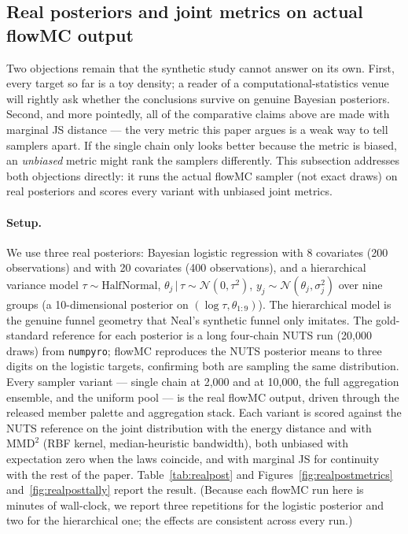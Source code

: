 \documentclass[11pt]{article}
\begin{document}
\subsection{Real posteriors and joint metrics on actual flowMC output}
\label{sec:realpost}
Two objections remain that the synthetic study cannot answer on its own. First,
every target so far is a toy density; a reader of a computational-statistics
venue will rightly ask whether the conclusions survive on genuine Bayesian
posteriors. Second, and more pointedly, all of the comparative claims above are
made with marginal JS distance --- the very metric this paper argues is a weak
way to tell samplers apart. If the single chain only looks better because the
metric is biased, an \emph{unbiased} metric might rank the samplers
differently. This subsection addresses both objections directly: it runs the
actual flowMC sampler (not exact draws) on real posteriors and scores every
variant with unbiased joint metrics.

\paragraph{Setup.} We use three real posteriors: Bayesian logistic regression
with 8 covariates (200 observations) and with 20 covariates (400
observations), and a hierarchical variance model
$\tau\sim\mathrm{HalfNormal}$, $\theta_j\,|\,\tau\sim\mathcal{N}(0,\tau^2)$,
$y_j\sim\mathcal{N}(\theta_j,\sigma_j^2)$ over nine groups (a 10-dimensional
posterior on $(\log\tau,\theta_{1:9})$). The hierarchical model is the genuine
funnel geometry that Neal's synthetic funnel only imitates. The
gold-standard reference for each posterior is a long four-chain NUTS run
(20{,}000 draws) from \texttt{numpyro}; flowMC reproduces the NUTS posterior
means to three digits on the logistic targets, confirming both are sampling the
same distribution. Every sampler variant --- single chain at 2{,}000 and at
10{,}000, the full aggregation ensemble, and the uniform pool --- is the real
flowMC output, driven through the released member palette and aggregation
stack. Each variant is scored against the NUTS reference on the joint
distribution with the energy distance and with $\mathrm{MMD}^2$ (RBF kernel,
median-heuristic bandwidth), both unbiased with expectation zero when the laws
coincide, and with marginal JS for continuity with the rest of the paper.
Table~\ref{tab:realpost} and Figures~\ref{fig:realpostmetrics}
and~\ref{fig:realposttally} report the result. (Because each flowMC run here is
minutes of wall-clock, we report three repetitions for the logistic posterior
and two for the hierarchical one; the effects are consistent across every run.)
\end{document}
